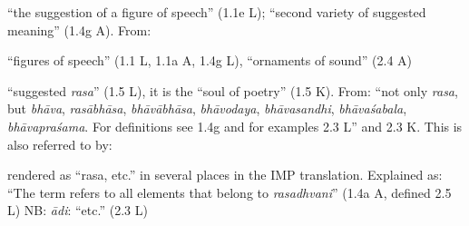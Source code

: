 \documentclass[10pt]{article}
\begin{document}
\begin{multicols}{2}
\begin{enumerate}[
			leftmargin=0em,
			rightmargin=0em,
		]
\begin{enumerate}
			 ``the suggestion of a figure of speech'' (1.1e L);
			``second variety of suggested meaning'' (1.4g A).
			From:
			\begin{itemize}
				 ``figures of speech'' (1.1 L, 1.1a A, 1.4g L), ``ornaments of sound'' (2.4 A)
			\end{itemize}

			 ``suggested \textit{rasa}'' (1.5 L),
			it is the ``soul of poetry'' (1.5 K).
			From: ``not only \textit{rasa},
			but \textit{bhāva}, %
			\textit{rasābhāsa}, %
			\textit{bhāvābhāsa}, %
			\textit{bhāvodaya}, %
			\textit{bhāvasandhi}, %
			\textit{bhāvaśabala}, %
			\textit{bhāvapraśama}. %
			For definitions see 1.4g and for examples 2.3 L''
			and 2.3 K. %
			This is also referred to by:
			\begin{itemize}
				 rendered as ``rasa, etc.'' in several places in the IMP translation.
				Explained as: ``The term refers to all elements that belong to \textit{rasadhvani}'' (1.4a A, defined 2.5 L) NB: \textit{ādi}: ``etc.'' (2.3 L)
			\end{itemize}



		\end{enumerate}


\end{enumerate}
\end{multicols}
\end{document}
